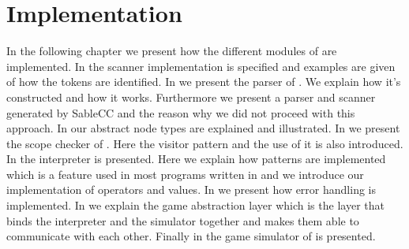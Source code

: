 \chapter{Implementation}
\label{chap:implementation}

In the following chapter we present how the different modules of \productname{} are implemented. In  the scanner implementation is specified and examples are given of how the tokens are identified. In  we present the parser of
\productname{}. We explain how it's constructed and how it works. Furthermore we present a parser and scanner generated by SableCC and the reason why we did not proceed with this approach. In  our abstract node types are explained and illustrated. In  we present the scope checker of \productname{}. Here the visitor pattern and the use of it is also introduced. In  the interpreter is presented. Here we explain how patterns are implemented which is a feature used in most programs written in \productname{} and we introduce our implementation of operators and values. In  we present how error handling is implemented. In  we explain the game abstraction layer which is the layer that binds the interpreter and the simulator together and makes them able to communicate with each other. Finally in  the game simulator of \productname{} is presented.    










